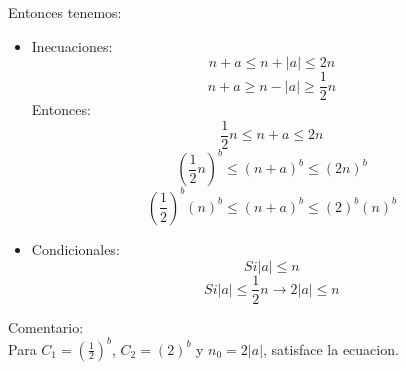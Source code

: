 \documentclass[10pt,a4paper]{article}
\begin{document}
\begin{itemize}
			 Entonces tenemos:
			 \begin{itemize}
			 	\item Inecuaciones: 
			 		\begin{equation*}
						n+a \leq n+\left |a  \right | \leq 2n
					\end{equation*}
					\begin{equation*}
						n + a \geq  n - \left |a  \right | \geq  \frac{1}{2}n
					\end{equation*}
					Entonces: 
					\begin{equation*}
						\frac{1}{2}n \leq n + a \leq 2n
					\end{equation*}
					\begin{equation*}
						(\frac{1}{2}n)^{b} \leq (n + a)^{b} \leq (2n)^{b}
					\end{equation*}
					\begin{equation*}
						(\frac{1}{2})^{b}(n)^{b} \leq (n + a)^{b} \leq (2)^{b}(n)^{b}
					\end{equation*}
			 	\item Condicionales: 
			 		\begin{equation*}
						Si \left |a  \right | \leq n
					\end{equation*}
			 		\begin{equation*}
						Si \left |a  \right | \leq \frac{1}{2}n \rightarrow 2\left |a  \right | \leq n
					\end{equation*}
			 \end{itemize}
			 Comentario: \\
			 Para $C_{1} = (\frac{1}{2})^{b}$, $C_{2} = (2)^{b}$ y  $n_{0} = 2\left |a  \right |$, satisface la ecuacion.
			 

\end{itemize}
\end{document}
